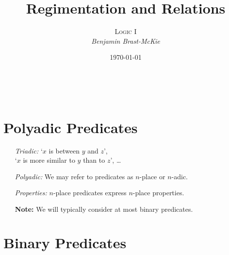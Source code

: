 \documentclass[a4paper, 11pt]{article} %
\title{\textbf{Regimentation and Relations}} %
\author{\textsc{Logic I}\\ \em Benjamin Brast-McKie} %
\date{\today} %
\makeatletter
\renewcommand{\maketitle}{
\begin{flushright}
{\LARGE\@title}

\vspace{10pt}

{\@author}
\\ \@date
\end{flushright}

\vspace{-20pt}

}
\makeatother
\begin{document}
\maketitle %

\thispagestyle{empty}


\section*{Polyadic Predicates}

\begin{enumerate}
  \item[\it Triadic:] 
    `$x$ is between $y$ and $z$',\\
    `$x$ is more similar to $y$ than to $z$', \ldots
  \item[\it Polyadic:] We may refer to predicates as $n$-place or $n$-adic.
  \item[\it Properties:] $n$-place predicates express $n$-place properties.
  \item[\bf Note:] We will typically consider at most binary predicates.
\end{enumerate}




\section*{Binary Predicates}
\end{document}
